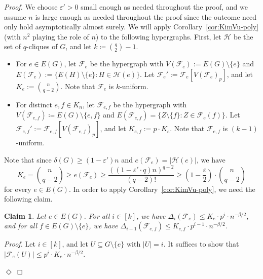 \documentclass[11pt]{article}
\numberwithin{equation}{section}
\newcommand{\eps}{\varepsilon}
\newcommand{\mc}[1]{\mathcal{#1}}
\newcounter{i}
\theoremstyle{plain}
\newtheorem{claim}{Claim}[thm]
\newenvironment{proofclaim}[1][]%
{\noindent \emph{Proof.} {}{#1}{}}{\hfill
	$\Diamond$\vspace{1em}}
\theoremstyle{plain} %
\theoremstyle{definition}
\newcommand{\cF}{\mathcal{F}}
\newcommand{\cH}{\mathcal{H}}
\newcommand{\aas}{a.a.s.\ }
\begin{document}
\begin{proof}
We choose $\varepsilon' > 0$ small enough as needed throughout the proof, and we assume $n$ is large enough as needed throughout the proof since the outcome need only hold asymptotically almost surely. 
We will apply Corollary~\ref{cor:KimVu-poly} (with $n^2$ playing the role of $n$) to the following hypergraphs. 
First, let $\cH$ be the set of $q$-cliques of $G$, and let $k \coloneqq \binom{q}{2} - 1$.  

\begin{itemize}
    \item For $e\in E(G)$, let $\cF_{e}$ be the hypergraph with $V(\cF_{e}):= E(G)\setminus \{e\}$ and $E(\cF_{e}):= \{E(H)\setminus \{e\}: H\in \mc{H}(e)\}$.
    Let $\cF_{e}' := \cF_{e}[V(\cF_{e})_p]$, and let $K_{e}:=\binom{n}{q-2}$.
    Note that $\cF_{e}$ is $k$-uniform.
    \item For distinct $e,f \in K_n$, let $\cF_{e,f}$ be the hypergraph with $V(\cF_{e,f}) \coloneqq E(G)\setminus \{e,f\}$ and $E(\cF_{e,f}) = \{Z \setminus \{f\} : Z \in \cF_{e}(f)\}$.
    Let $\cF_{e,f}':=\cF_{e,f}[V(\cF_{e,f})_p]$, and let $K_{e,f} :=p\cdot K_{e}$. 
    Note that $\cF_{e,f}$ is $(k-1)$-uniform. 
\end{itemize}

Note that since $\delta(G) \geq (1 - \eps')n$ and $e(\cF_e) = |\cH(e)|$, we have
\begin{equation}\label{eqn:random-reserve:K-bounds}
    K_e = \binom{n}{q - 2} \geq e(\cF_{e}) \geq \frac{((1 - \eps' \cdot q)n)^{q - 2}}{(q-2)!} \geq \left(1 - \frac{\eps}{2}\right)\cdot \binom{n}{q - 2}
\end{equation}
for every $e \in E(G)$.
In order to apply Corollary~\ref{cor:KimVu-poly}, we need the following claim.

\begin{claim}\label{cl:F1bounds}
Let $e \in E(G)$.  For all $i\in [k]$, we have $\Delta_i(\cF_{e}) \le K_{e} \cdot p^i \cdot n^{-\beta/2}$, and for all $f \in E(G)\setminus\{e\}$, we have $\Delta_{i-1}(\cF_{e,f}) \leq K_{e,f}\cdot p^{i-1}\cdot n^{-\beta/2}$.
\end{claim}
\begin{proofclaim}
Let $i\in [k]$, and let $U\subseteq G\setminus \{e\}$ with $|U|=i$. It suffices to show that $|\cF_{e}(U)| \le p^i\cdot K_{e}\cdot n^{-\beta/2}$.


\end{proofclaim}
\end{proof}
\end{document}
